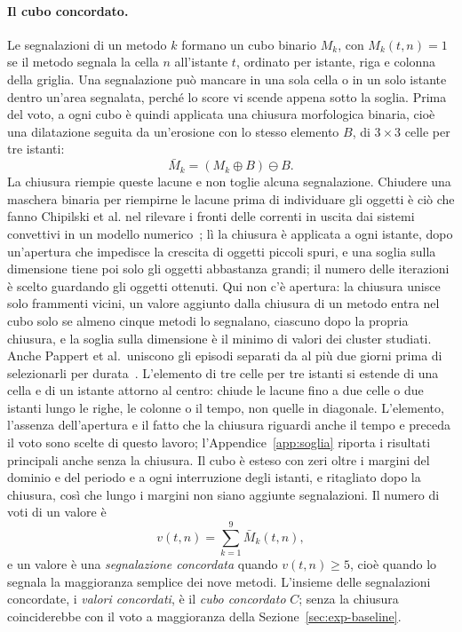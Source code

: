 \paragraph{Il cubo concordato.} Le segnalazioni di un metodo $k$ formano un cubo binario $M_k$, con $M_k(t,n)=1$ se il metodo segnala la cella $n$ all'istante $t$, ordinato per istante, riga e colonna della griglia. Una segnalazione può mancare in una sola cella o in un solo istante dentro un'area segnalata, perché lo score vi scende appena sotto la soglia. Prima del voto, a ogni cubo è quindi applicata una chiusura morfologica binaria, cioè una dilatazione seguita da un'erosione con lo stesso elemento $B$, di $3\times3$ celle per tre istanti:
\begin{equation}
\bar{M}_k=(M_k\oplus B)\ominus B .
\end{equation}
La chiusura riempie queste lacune e non toglie alcuna segnalazione. Chiudere una maschera binaria per riempirne le lacune prima di individuare gli oggetti è ciò che fanno Chipilski et al. nel rilevare i fronti delle correnti in uscita dai sistemi convettivi in un modello numerico~\cite{chipilski2018outflow}; lì la chiusura è applicata a ogni istante, dopo un'apertura che impedisce la crescita di oggetti piccoli spuri, e una soglia sulla dimensione tiene poi solo gli oggetti abbastanza grandi; il numero delle iterazioni è scelto guardando gli oggetti ottenuti. Qui non c'è apertura: la chiusura unisce solo frammenti vicini, un valore aggiunto dalla chiusura di un metodo entra nel cubo solo se almeno cinque metodi lo segnalano, ciascuno dopo la propria chiusura, e la soglia sulla dimensione è il minimo di valori dei cluster studiati. Anche Pappert et al.\ uniscono gli episodi separati da al più due giorni prima di selezionarli per durata~\cite{pappert2025hotspells}. L'elemento di tre celle per tre istanti si estende di una cella e di un istante attorno al centro: chiude le lacune fino a due celle o due istanti lungo le righe, le colonne o il tempo, non quelle in diagonale. L'elemento, l'assenza dell'apertura e il fatto che la chiusura riguardi anche il tempo e preceda il voto sono scelte di questo lavoro; l'Appendice~\ref{app:soglia} riporta i risultati principali anche senza la chiusura. Il cubo è esteso con zeri oltre i margini del dominio e del periodo e a ogni interruzione degli istanti, e ritagliato dopo la chiusura, così che lungo i margini non siano aggiunte segnalazioni. Il numero di voti di un valore è
\begin{equation}
v(t,n)=\sum_{k=1}^{9}\bar{M}_k(t,n),
\end{equation}
e un valore è una \emph{segnalazione concordata} quando $v(t,n)\ge5$, cioè quando lo segnala la maggioranza semplice dei nove metodi. L'insieme delle segnalazioni concordate, i \emph{valori concordati}, è il \emph{cubo concordato} $C$; senza la chiusura coinciderebbe con il voto a maggioranza della Sezione~\ref{sec:exp-baseline}.

